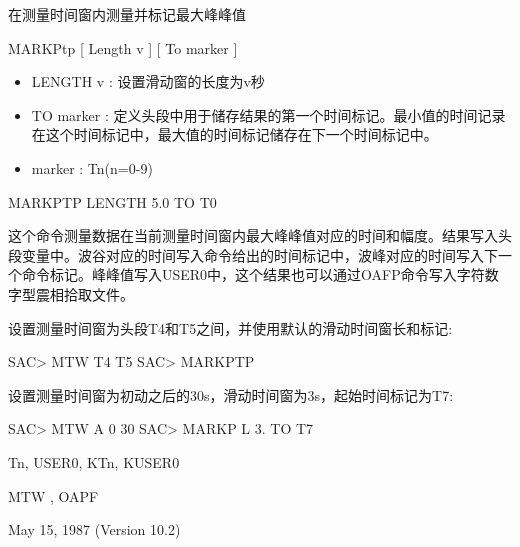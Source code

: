 \label{cmd:markptp}

在测量时间窗内测量并标记最大峰峰值

MARKPtp [ Length v ] [ To marker ]

\begin{itemize}
\item LENGTH v : 设置滑动窗的长度为v秒 
\item TO marker : 定义头段中用于储存结果的第一个时间标记。最小值的时间记录在这个时间标记中，最大值的时间标记储存在下一个时间标记中。 
\item marker : Tn(n=0-9)
\end{itemize}

MARKPTP LENGTH 5.0 TO T0

这个命令测量数据在当前测量时间窗内最大峰峰值对应的时间和幅度。结果写入头段变量中。波谷对应的时间写入命令给出的时间标记中，波峰对应的时间写入下一个命令标记。峰峰值写入USER0中，这个结果也可以通过OAFP命令写入字符数字型震相拾取文件。

设置测量时间窗为头段T4和T5之间，并使用默认的滑动时间窗长和标记:
\begin{SACCode}
SAC> MTW T4 T5
SAC> MARKPTP
\end{SACCode}

设置测量时间窗为初动之后的30s，滑动时间窗为3s，起始时间标记为T7:
\begin{SACCode}
SAC> MTW A 0 30
SAC> MARKP L 3. TO T7
\end{SACCode}

Tn, USER0, KTn, KUSER0

MTW , OAPF

May 15, 1987 (Version 10.2)
